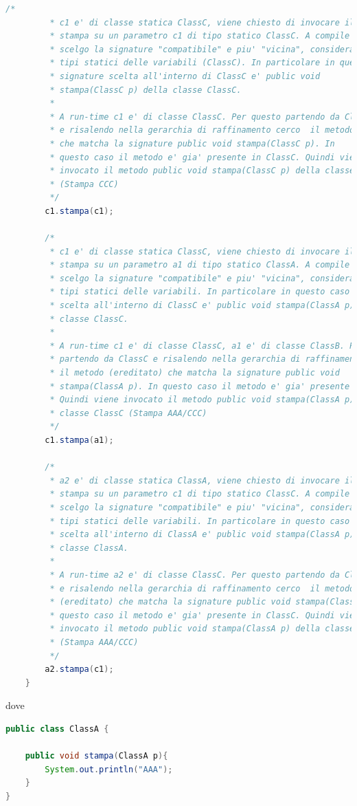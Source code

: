\documentclass{article}
\begin{document}
\begin{lstlisting}[language=Java,escapechar=|]
		/*
		 * c1 e' di classe statica ClassC, viene chiesto di invocare il metodo 
		 * stampa su un parametro c1 di tipo statico ClassC. A compile 
		 * scelgo la signature "compatibile" e piu' "vicina", considerando i 
		 * tipi statici delle variabili (ClassC). In particolare in questo caso la 
		 * signature scelta all'interno di ClassC e' public void 
		 * stampa(ClassC p) della classe ClassC.
		 * 
		 * A run-time c1 e' di classe ClassC. Per questo partendo da ClassC 
		 * e risalendo nella gerarchia di raffinamento cerco  il metodo (ereditato)
		 * che matcha la signature public void stampa(ClassC p). In
		 * questo caso il metodo e' gia' presente in ClassC. Quindi viene
		 * invocato il metodo public void stampa(ClassC p) della classe ClassC
		 * (Stampa CCC)
		 */
		c1.stampa(c1);
		
		/*
		 * c1 e' di classe statica ClassC, viene chiesto di invocare il metodo 
		 * stampa su un parametro a1 di tipo statico ClassA. A compile time 
		 * scelgo la signature "compatibile" e piu' "vicina", considerando i 
		 * tipi statici delle variabili. In particolare in questo caso la signature 
		 * scelta all'interno di ClassC e' public void stampa(ClassA p) della 
		 * classe ClassC.
		 * 
		 * A run-time c1 e' di classe ClassC, a1 e' di classe ClassB. Per questo
		 * partendo da ClassC e risalendo nella gerarchia di raffinamento cerco
		 * il metodo (ereditato) che matcha la signature public void 
		 * stampa(ClassA p). In questo caso il metodo e' gia' presente in ClassC. 
		 * Quindi viene invocato il metodo public void stampa(ClassA p) della 
		 * classe ClassC (Stampa AAA/CCC)
		 */
		c1.stampa(a1);

		/*
		 * a2 e' di classe statica ClassA, viene chiesto di invocare il metodo 
		 * stampa su un parametro c1 di tipo statico ClassC. A compile 
		 * scelgo la signature "compatibile" e piu' "vicina", considerando i 
		 * tipi statici delle variabili. In particolare in questo caso la signature 
		 * scelta all'interno di ClassA e' public void stampa(ClassA p) della 
		 * classe ClassA.
		 * 
		 * A run-time a2 e' di classe ClassC. Per questo partendo da ClassC 
		 * e risalendo nella gerarchia di raffinamento cerco  il metodo 
		 * (ereditato) che matcha la signature public void stampa(ClassA p). In
		 * questo caso il metodo e' gia' presente in ClassC. Quindi viene
		 * invocato il metodo public void stampa(ClassA p) della classe ClassC
		 * (Stampa AAA/CCC)
		 */
		a2.stampa(c1);
	}
\end{lstlisting}
dove 
\begin{lstlisting}[language=Java,escapechar=|]
public class ClassA {

	public void stampa(ClassA p){
		System.out.println("AAA");
	}
}
\end{lstlisting}
\end{document}
